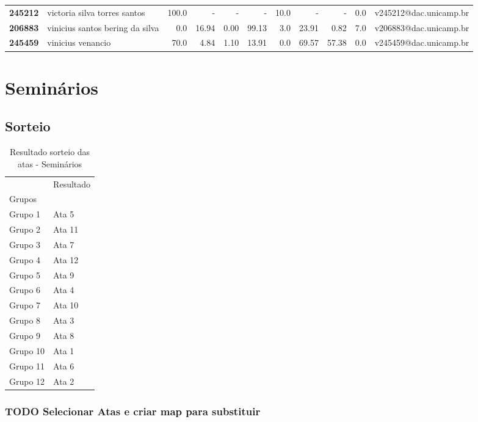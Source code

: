 \documentclass[11pt]{article}
\begin{document}
\begin{center}
\begin{landscape}
\begin{longtable}{llrrrrrrrrl}
\textbf{245212} &          victoria silva torres santos &                 100.0 &           - &           - &           - &                     10.0 &           - &           - &                        0.0 &  v245212@dac.unicamp.br \\
\textbf{206883} &       vinicius santos bering da silva &                   0.0 &       16.94 &        0.00 &       99.13 &                      3.0 &       23.91 &        0.82 &                        7.0 &  v206883@dac.unicamp.br \\
\textbf{245459} &                     vinicius venancio &                  70.0 &        4.84 &        1.10 &       13.91 &                      0.0 &       69.57 &       57.38 &                        0.0 &  v245459@dac.unicamp.br \\
\end{longtable}
\end{landscape}\end{center}


\section{Seminários}
\label{sec:orgd228ae4}
\subsection{Sorteio}
\label{sec:orgb636509}

\begin{table}
\centering
\caption{Resultado sorteio das atas - Seminários}
\begin{tabular}{ll}
\toprule
{} & Resultado \\
Grupos   &           \\
\midrule
Grupo 1  &     Ata 5 \\
Grupo 2  &    Ata 11 \\
Grupo 3  &     Ata 7 \\
Grupo 4  &    Ata 12 \\
Grupo 5  &     Ata 9 \\
Grupo 6  &     Ata 4 \\
Grupo 7  &    Ata 10 \\
Grupo 8  &     Ata 3 \\
Grupo 9  &     Ata 8 \\
Grupo 10 &     Ata 1 \\
Grupo 11 &     Ata 6 \\
Grupo 12 &     Ata 2 \\
\bottomrule
\end{tabular}
\end{table}



\subsubsection{{\bfseries\sffamily TODO} Selecionar Atas e criar map para substituir}
\label{sec:org0f27abe}
\end{document}
